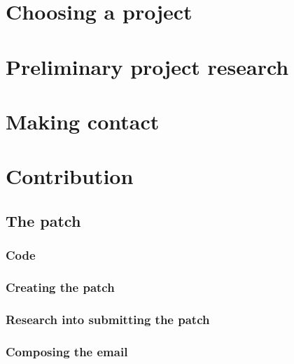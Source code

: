 \documentclass{article}
\begin{document}
\section{Choosing a project} %
\label{sec:choosing_a_project}


\section{Preliminary project research} %
\label{sec:preliminary_project_research}


\section{Making contact} %
\label{sec:making_contact}


\section{Contribution} %
\label{sec:contribution}

\subsection{The patch} %
\label{sub:the_patch}

\subsubsection{Code} %
\label{subsub:code}


\subsubsection{Creating the patch}
\label{subsub:creating_the_patch}


\subsubsection{Research into submitting the patch}
\label{subsub:research_into_submitting_the_patch}

\subsubsection{Composing the email}
\label{subsub:composing_the_email}
\end{document}
